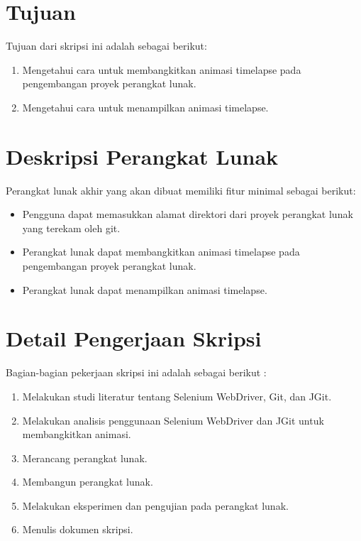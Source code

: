 \documentclass[a4paper,twoside]{article}
\begin{document}
\section{Tujuan}
Tujuan dari skripsi ini adalah sebagai berikut:
\begin{enumerate}
	\item Mengetahui cara untuk membangkitkan animasi timelapse pada pengembangan proyek perangkat lunak.
	\item Mengetahui cara untuk menampilkan animasi timelapse. 
\end{enumerate}

\section{Deskripsi Perangkat Lunak}
Perangkat lunak akhir yang akan dibuat memiliki fitur minimal sebagai berikut:
\begin{itemize}
	\item Pengguna dapat memasukkan alamat direktori dari proyek perangkat lunak yang terekam oleh git.   
	\item Perangkat lunak dapat membangkitkan animasi timelapse pada pengembangan proyek perangkat lunak.
	\item Perangkat lunak dapat menampilkan animasi timelapse. 
\end{itemize}

\section{Detail Pengerjaan Skripsi}
Bagian-bagian pekerjaan skripsi ini adalah sebagai berikut :
	\begin{enumerate}
		\item Melakukan studi literatur tentang Selenium WebDriver, Git, dan JGit.
		\item Melakukan analisis penggunaan Selenium WebDriver dan JGit untuk membangkitkan animasi.
		\item Merancang perangkat lunak.
		\item Membangun perangkat lunak.
		\item Melakukan eksperimen dan pengujian pada perangkat lunak.
		\item Menulis dokumen skripsi.
	\end{enumerate}
\end{document}
